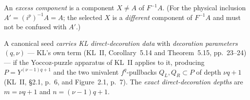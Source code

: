 \begin{definition}\label{def:excess}
An \emph{excess component} is a component \(X\ne A\) of \(F^{-1}A\).  (For the physical inclusion \(A'=(i^p)^{-1}A=A\); the selected \(X\) is a \emph{different} component of \(F^{-1}A\) and must not be confused with \(A'\).)
\end{definition}

\begin{definition}\label{def:decoration}
A canonical seed \emph{carries KL direct-decoration data} with \emph{decoration parameters} \((q,\nu)\) --- KL's own term (KL~II, Corollary~5.14 and Theorem~5.15, pp.~23--24) --- if the Yoccoz-puzzle apparatus of KL~II applies to it, producing \(P=Y^{(\nu-1)q+1}\) and the two univalent \(f^q\)-pullbacks \(Q_L,Q_R\subset P\) of depth \(\nu q+1\) (KL~II, \S2.1, p.~6, and Figure~2.1, p.~7).  The \emph{exact direct-decoration depths} are \(m=\nu q+1\) and \(n=(\nu-1)q+1\).
\end{definition}